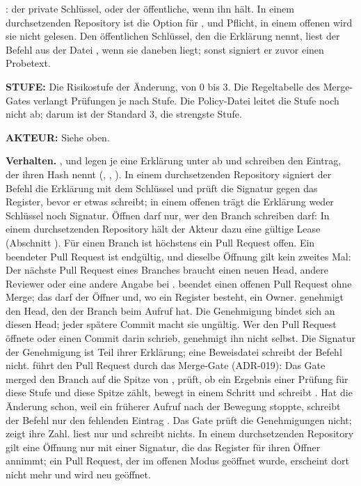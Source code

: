 : der private Schlüssel, oder der öffentliche, wenn  ihn
hält. In einem durchsetzenden Repository ist die Option für ,  und
 Pflicht, in einem offenen wird sie nicht gelesen.
Den öffentlichen Schlüssel, den die Erklärung nennt, liest der Befehl aus der Datei
, wenn sie daneben liegt; sonst signiert er zuvor einen Probetext.
\item {\bf {} STUFE:} Die Risikostufe der Änderung, von 0 bis 3. Die Regeltabelle
des Merge-Gates verlangt Prüfungen je nach Stufe. Die Policy-Datei leitet die Stufe noch nicht ab;
darum ist der Standard 3, die strengste Stufe.
\item {\bf {} AKTEUR:} Siehe oben.
\stopitemize

{\bf Verhalten.} ,  und  legen je eine Erklärung unter
 ab und schreiben den Eintrag, der ihren Hash nennt
(, , ).
In einem durchsetzenden Repository signiert der Befehl die Erklärung mit dem Schlüssel und prüft
die Signatur gegen das Register, bevor er etwas schreibt; in einem offenen trägt die Erklärung
weder Schlüssel noch Signatur.
Öffnen darf nur, wer den Branch
schreiben darf: In einem durchsetzenden Repository hält der Akteur dazu eine gültige Lease
(Abschnitt ). Für einen Branch ist höchstens ein Pull Request offen.
Ein beendeter Pull Request ist endgültig, und dieselbe Öffnung gilt kein zweites Mal: Der
nächste Pull Request eines Branches braucht einen neuen Head, andere Reviewer oder eine andere
Angabe bei .
 beendet einen offenen Pull Request ohne Merge; das darf der Öffner und, wo ein
Register besteht, ein Owner.
 genehmigt den Head, den der Branch beim Aufruf hat. Die Genehmigung bindet sich an
diesen Head; jeder spätere Commit macht sie ungültig. Wer den Pull Request öffnete oder einen
Commit darin schrieb, genehmigt ihn nicht selbst. Die Signatur der Genehmigung ist Teil ihrer
Erklärung; eine Beweisdatei schreibt der Befehl nicht.
 führt den Pull Request durch das Merge-Gate (ADR-019): Das Gate merged den Branch auf
die Spitze von , prüft, ob ein Ergebnis einer Prüfung für diese Stufe und diese Spitze
zählt, bewegt  in einem Schritt und schreibt . Hat  die
Änderung schon, weil ein früherer Aufruf nach der Bewegung stoppte, schreibt der Befehl nur den
fehlenden Eintrag . Das Gate prüft die Genehmigungen nicht;  zeigt
ihre Zahl.
 liest nur und schreibt nichts.
In einem durchsetzenden Repository gilt eine Öffnung nur mit einer Signatur, die das Register
für ihren Öffner annimmt; ein Pull Request, der im offenen Modus geöffnet wurde, erscheint dort
nicht mehr und wird neu geöffnet.

